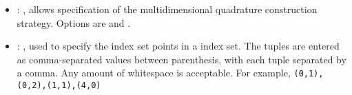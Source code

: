 \begin{itemize}
    \item {}: , 
      allows specification of the multidimensional
      quadrature construction strategy.  Options are  and .

    \item {}: , 
      used to specify the index set points in a  index set.  The tuples are
      entered as comma-separated values between parenthesis, with each tuple separated by a comma.
      Any amount of whitespace is acceptable.  For example,
      \verb'(0,1),(0,2),(1,1),(4,0)'


\end{itemize}

